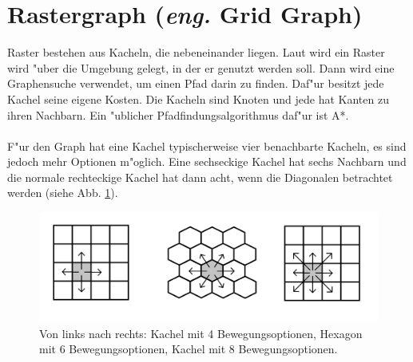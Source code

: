 \section{Rastergraph (\textit{eng.} Grid Graph)}
Raster bestehen aus Kacheln, die nebeneinander liegen. Laut \cite{Grid:02} wird ein Raster wird "uber die Umgebung gelegt, in der er genutzt werden soll. Dann wird eine Graphensuche verwendet, um einen Pfad darin zu finden. Daf"ur besitzt jede Kachel seine eigene Kosten. Die Kacheln sind Knoten und jede hat Kanten zu ihren Nachbarn. Ein "ublicher Pfadfindungsalgorithmus daf"ur ist A*.
\\\\
F"ur den Graph hat eine Kachel typischerweise vier benachbarte Kacheln, es sind jedoch mehr Optionen m"oglich. Eine sechseckige Kachel hat sechs Nachbarn und die normale rechteckige Kachel hat dann acht, wenn die Diagonalen betrachtet werden (siehe Abb. \ref{sec2a}).
\begin{figure} %
	\centering
	\includegraphics[width=\textwidth]{images/Grid_Tiles.png}
	\caption{Von links nach rechts: Kachel mit 4 Bewegungsoptionen, Hexagon mit 6 Bewegungsoptionen, Kachel mit 8 Bewegungsoptionen.}
	\label{sec2a}
\end{figure}


